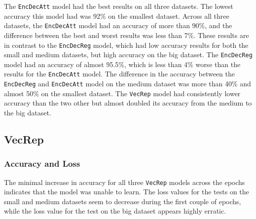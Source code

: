 The {\tt EncDecAtt} model had the best results on all three datasets. The lowest accuracy this model had was 92\% on the smallest dataset. Across all three datasets, the {\tt EncDecAtt} model had an accuracy of more than 90\%, and the difference between the best and worst results was less than 7\%. These results are in contrast to the {\tt EncDecReg} model, which had low accuracy results for both the small and medium datasets, but high accuracy on the big dataset. The {\tt EncDecReg} model had an accuracy of almost 95.5\%, which is less than 4\% worse than the results for the {\tt EncDecAtt} model. The difference in the accuracy between the {\tt EncDecReg} and {\tt EncDecAtt} model on the medium dataset was more than 40\% and almost 50\% on the smallest dataset. The {\tt VecRep} model had consistently lower accuracy than the two other but almost doubled its accuracy from the medium to the big dataset.

\subsection{VecRep}
\subsubsection{Accuracy and Loss}
\newpage
{}

The minimal increase in accuracy for all three {\tt VecRep} models across the epochs indicates that the model was unable to learn. The loss values for the tests on the small and medium datasets seem to decrease during the first couple of epochs, while the loss value for the test on the big dataset appears highly erratic.

\newpage
